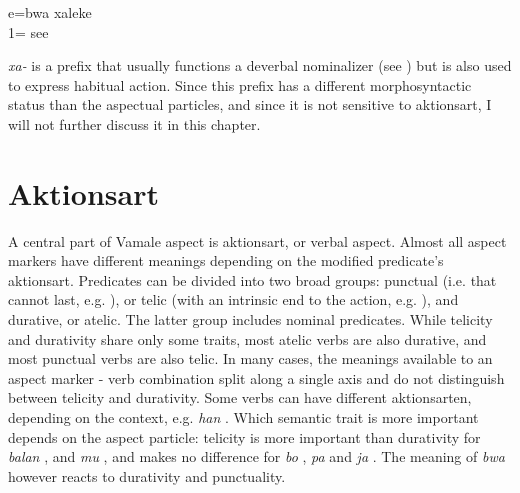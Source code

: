 \ea\label{ex:bwa1}
\gll e={bwa} xaleke\\
 1= see\\
\glt {}
\z
%
%

\textit{xa-}  is a prefix that usually functions a deverbal nominalizer (see ) but is also used to express habitual action. Since this prefix has a different morphosyntactic status than the aspectual particles, and since it is not sensitive to aktionsart, I will not further discuss it in this chapter.

\section{Aktionsart}
A central part of Vamale aspect is aktionsart, or verbal aspect. Almost all aspect markers have different meanings depending on the modified predicate's aktionsart. Predicates can be divided into two broad groups: punctual (i.e. that cannot last, e.g. ), or telic (with an intrinsic end to the action, e.g. ), and durative, or atelic. The latter group includes nominal predicates. While telicity and durativity share only some traits, most atelic verbs are also durative, and most punctual verbs are also telic. In many cases, the meanings available to an aspect marker - verb combination split along a single axis and do not distinguish between telicity and durativity. Some verbs can have different aktionsarten, depending on the context, e.g. \textit{han} . Which semantic trait is more important depends on the aspect particle: telicity is more important than durativity for \textit{balan} , and \textit{mu} , and makes no difference for \textit{bo} , \textit{pa}  and \textit{ja} . The meaning of \textit{bwa} however reacts to durativity and punctuality.

